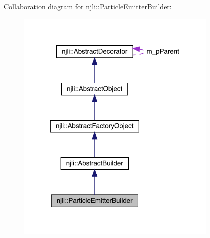 Collaboration diagram for njli\+:\+:Particle\+Emitter\+Builder\+:\nopagebreak
\begin{figure}[H]
\begin{center}
\leavevmode
\includegraphics[width=273pt]{classnjli_1_1_particle_emitter_builder__coll__graph}
\end{center}
\end{figure}
